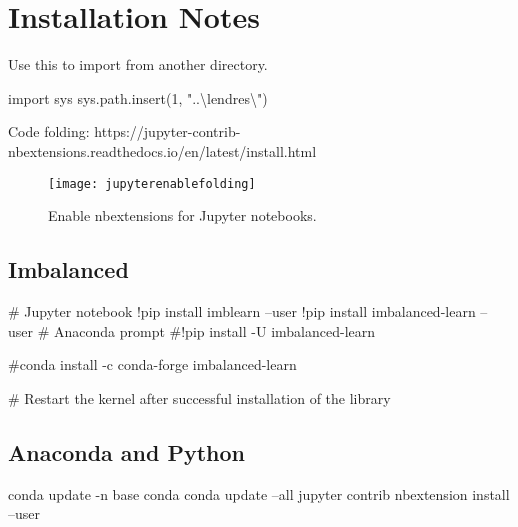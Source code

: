 	\chapter{Installation Notes}

Use this to import from another directory.
	\begin{code}[\codenumbering]{}
		\codeitemnonumber import sys
		\codeitemnonumber sys.path.insert(1, "..\textbackslash{}lendres\textbackslash{}")
	\end{code}


Code folding:
https://jupyter-contrib-nbextensions.readthedocs.io/en/latest/install.html

	\begin{figure}[tbp]
		\centering
		\texttt{[image: jupyterenablefolding]}
		\caption{Enable nbextensions for Jupyter notebooks.}
		\label{fig:normaldistrution}
	\end{figure}


	\section{Imbalanced}
	\begin{code}[\codenumbering]{}
		\codeitemnonumber \# Jupyter notebook
		\codeitemnonumber !pip install imblearn --user
		\codeitemnonumber !pip install imbalanced-learn --user
		\codeitemnonumber
		\codeitemnonumber \# Anaconda prompt
		\codeitemnonumber \#!pip install -U imbalanced-learn

		\codeitemnonumber \#conda install -c conda-forge imbalanced-learn

		\codeitemnonumber \# Restart the kernel after successful installation of the library
	\end{code}

	\section{Anaconda and Python}
	\begin{code}[\codenumbering]{}
		\codeitemnonumber conda update -n base conda
		\codeitemnonumber conda update --all
		\codeitemnonumber jupyter contrib nbextension install --user
	\end{code}




